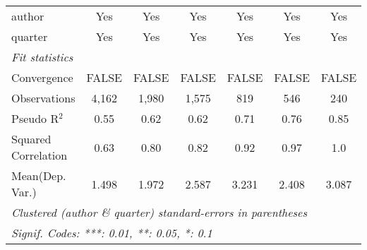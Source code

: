 \begin{tabular}{lcccccc}
   author                                                     & Yes          & Yes           & Yes          & Yes           & Yes           & Yes\\  
   quarter                                                    & Yes          & Yes           & Yes          & Yes           & Yes           & Yes\\  
   \midrule
   \emph{Fit statistics}\\
   Convergence                                                &FALSE         & FALSE         & FALSE        & FALSE         & FALSE         & FALSE\\  
   Observations                                               & 4,162        & 1,980         & 1,575        & 819           & 546           & 240\\  
   Pseudo R$^2$                                               & 0.55         & 0.62          & 0.62         & 0.71          & 0.76          & 0.85\\  
   Squared Correlation                                        & 0.63         & 0.80          & 0.82         & 0.92          & 0.97          & 1.0\\  
Mean(Dep. Var.) & 1.498 & 1.972 & 2.587 & 3.231 & 2.408 & 3.087 \\
   \midrule \midrule
   \multicolumn{7}{l}{\emph{Clustered (author \& quarter) standard-errors in parentheses}}\\
   \multicolumn{7}{l}{\emph{Signif. Codes: ***: 0.01, **: 0.05, *: 0.1}}\\
\end{tabular}
\par\endgroup
